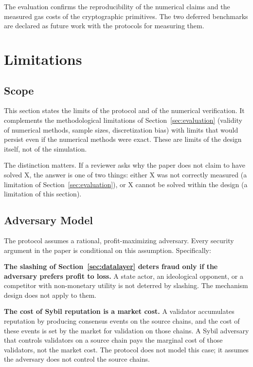 \documentclass[11pt,a4paper]{article}
\numberwithin{equation}{section}
\numberwithin{table}{section}
\begin{document}
The evaluation confirms the reproducibility of the numerical claims and the measured gas costs of the cryptographic primitives. The two deferred benchmarks are declared as future work with the protocols for measuring them.

\section{Limitations}
\label{sec:limitations}

\subsection{Scope}
This section states the limits of the protocol and of the numerical verification. It complements the methodological limitations of Section~\ref{sec:evaluation} (validity of numerical methods, sample sizes, discretization bias) with limits that would persist even if the numerical methods were exact. These are limits of the design itself, not of the simulation.

The distinction matters. If a reviewer asks why the paper does not claim to have solved X, the answer is one of two things: either X was not correctly measured (a limitation of Section~\ref{sec:evaluation}), or X cannot be solved within the design (a limitation of this section).

\subsection{Adversary Model}
The protocol assumes a rational, profit-maximizing adversary. Every security argument in the paper is conditional on this assumption. Specifically:

\textbf{The slashing of Section~\ref{sec:datalayer} deters fraud only if the adversary prefers profit to loss.} A state actor, an ideological opponent, or a competitor with non-monetary utility is not deterred by slashing. The mechanism design does not apply to them.

\textbf{The cost of Sybil reputation is a market cost.} A validator accumulates reputation by producing consensus events on the source chains, and the cost of these events is set by the market for validation on those chains. A Sybil adversary that controls validators on a source chain pays the marginal cost of those validators, not the market cost. The protocol does not model this case; it assumes the adversary does not control the source chains.
\end{document}

